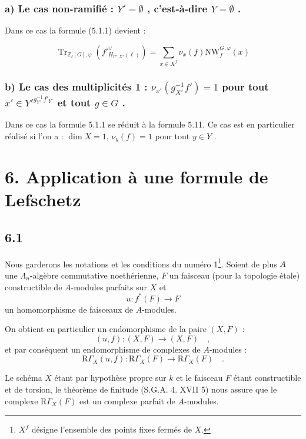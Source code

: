 \documentclass[11pt]{article}
\newcommand{\R}{\mathrm{R}}\newcommand{\RHomCore}{\mathrm{RHom}}
\providecommand{\Tr}{\operatorname{Tr}}
\providecommand{\Tr}{\operatorname{Tr}}
\providecommand{\Tr}{\operatorname{Tr}}
\providecommand{\R}{\mathrm R}
\providecommand{\Tr}{\operatorname{Tr}}
\providecommand{\La}{\Lambda}
\providecommand{\bZ}{\mathbb Z}
\providecommand{\Tr}{\operatorname{Tr}}
\begin{document}
\subsubsection*{a) Le cas non-ramifié : $Y' = \emptyset$ , c'est-à-dire $Y = \emptyset$ .}

Dans ce cas la formule (5.1.1) devient :

\begin{equation}\tag{5.11}
\Tr_{\bZ_\ell[G],\varphi}(f'^\vee_{H_{U',X'}(\ell)}) = \sum_{x \in X^f} \nu_x(f) \mathrm{NW}_f^{G,\varphi}(x)
\end{equation}

\subsubsection*{b) Le cas des multiplicités 1 : $\nu_{x'}(g_{X'}^{-1}f') = 1$ pour tout $x'\in {Y'}^{g_{Y'}^{-1}f'_{Y'}}$ et tout $g\in G$ .}

Dans ce cas la formule 5.1.1 se réduit à la formule 5.11. Ce cas est en particulier réalisé si l'on a : $\dim X = 1$, $\nu_y(f)=1$ pour tout $y\in Y$ .%

\section*{6. Application à une formule de Lefschetz}

\subsection*{6.1}
Nous garderons les notations et les conditions du numéro 1\footnote{$X^f$ désigne l'ensemble des points fixes fermés de $X$.}. Soient de plus $A$ une $\La_n$-algèbre commutative noethérienne, $F$ un faisceau (pour la topologie étale) constructible de $A$-modules parfaits sur $X$ et
\[
u : f^*(F) \longrightarrow F
\]
un homomorphisme de faisceaux de $A$-modules.

On obtient en particulier un endomorphisme de la paire $(X, F)$ :
\[
(u, f) : (X, F) \longrightarrow (X, F) \quad ,
\]
et par conséquent un endomorphisme de complexes de $A$-modules :
\[
\R\Gamma_X(u, f) : \R\Gamma_X(F) \longrightarrow \R\Gamma_X(F) \quad .
\]

Le schéma $X$ étant par hypothèse propre sur $k$ et le faisceau $F$ étant constructible et de torsion, le théorème de finitude (S.G.A. 4. XVII 5) nous assure que le complexe $\R\Gamma_X(F)$ est un complexe parfait de $A$-modules.
\end{document}
